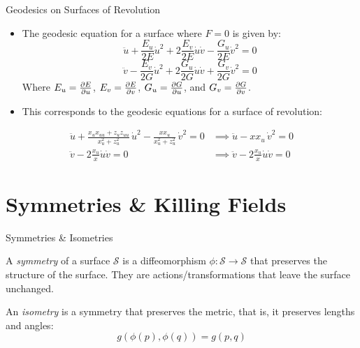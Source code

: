 \documentclass{beamer}
\begin{document}
\begin{frame}{Geodesics on Surfaces of Revolution}
	\footnotesize
	\begin{itemize}[<+->]
		\item The geodesic equation for a surface where $F = 0$ is given by:
		\[
			\ddot{u} + \frac{E_{u}}{2E}\dot{u}^{2} + 2\frac{E_{v}}{2E}\dot{u}\dot{v} - \frac{G_{u}}{2E}\dot{v}^{2} = 0
		\]
		\[
			\ddot{v} - \frac{E_{v}}{2G}\dot{u}^{2} + 2\frac{G_{u}}{2G}\dot{u}\dot{v} + \frac{G_{v}}{2G}\dot{v}^{2} = 0
		\]
		Where $E_{u} = \pdv{E}{u}$, $E_{v} = \pdv{E}{v}$, $G_{u} = \pdv{G}{u}$, and $G_{v} = \pdv{G}{v}$.
		\item This corresponds to the geodesic equations for a surface of revolution:
	\end{itemize}
	\begin{align*}
		\ddot{u} + \frac{x_{u}x_{uu} + z_{u}z_{uu}}{ x_{u}^{2} + z_{u}^{2}}\,\dot{u}^2 - \frac{x x_{u}}{x_{u}^{2} + z_{u}^{2}}\,\dot{v}^{2} = 0 &\implies \ddot{u} - x x_{u}\,\dot{v}^{2} = 0 \\
		\ddot{v} - 2\frac{x_{u}}{x}\dot{u}\dot{v} = 0 &\implies \ddot{v} - 2\frac{x_{u}}{x}\dot{u}\dot{v} = 0
	\end{align*}
\end{frame} 


\section{Symmetries \& Killing Fields}
\begin{frame}{Symmetries \& Isometries}
	\begin{definition}[Symmetry]
		A \emph{symmetry} of a surface $\mathcal{S}$ is a diffeomorphism $\phi: \mathcal{S} \to \mathcal{S}$ that preserves the structure of the surface.
		They are actions/transformations that leave the surface unchanged.
	\end{definition}
	\vspace{1ex}
	\pause 
	\begin{definition}[Isometry]
		An \emph{isometry} is a symmetry that preserves the metric, that is, it preserves lengths and angles:
		\[
			g(\phi(p), \phi(q)) = g(p, q)
		\]
	\end{definition}
\end{frame}
\end{document}
